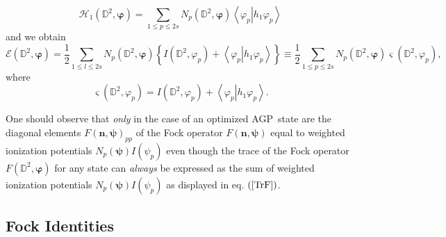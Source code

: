 \documentclass[aps,preprint]{revtex4}%
\begin{document}
\begin{equation}
\mathcal{H}_{1}\left(  \mathbb{D}^{2},\mathbf{\varphi}\right)  =%
{\textstyle\sum\limits_{1\leq p\leq2s}}
N_{p}\left(  \mathbb{D}^{2},\mathbf{\varphi}\right)  \left\langle \left.
\varphi_{p}\right\vert h_{1}\varphi_{p}\right\rangle
\end{equation}
and we obtain
\begin{equation}
\mathcal{E}\left(  \mathbb{D}^{2},\mathbf{\varphi}\right)  =\frac{1}{2}%
{\textstyle\sum\limits_{1\leq l\leq2s}}
N_{p}\left(  \mathbb{D}^{2},\mathbf{\varphi}\right)  \left\{  I\left(
\mathbb{D}^{2},\varphi_{p}\right)  +\left\langle \left.  \varphi
_{p}\right\vert h_{1}\varphi_{p}\right\rangle \right\}  \equiv\frac{1}{2}%
{\textstyle\sum\limits_{1\leq p\leq2s}}
N_{p}\left(  \mathbb{D}^{2},\mathbf{\varphi}\right)  \varsigma\left(
\mathbb{D}^{2},\varphi_{p}\right)  ,
\end{equation}
where
\begin{equation}
\varsigma\left(  \mathbb{D}^{2},\varphi_{p}\right)  =I\left(  \mathbb{D}%
^{2},\varphi_{p}\right)  +\left\langle \left.  \varphi_{p}\right\vert
h_{1}\varphi_{p}\right\rangle .
\end{equation}


One should observe that \emph{only} in the case of an optimized AGP\ state are
the diagonal elements $F\left(  \mathbf{n},\mathbf{\psi}\right)  _{pp}$ of the
Fock operator $F\left(  \mathbf{n},\mathbf{\psi}\right)  $ equal to weighted
ionization potentials $N_{p}\left(  \mathbf{\psi}\right)  I\left(  \psi
_{p}\right)  $ even though the trace of the Fock operator $F\left(
\mathbb{D}^{2},\mathbf{\varphi}\right)  $ for any state can \emph{always }be
expressed as the sum of weighted ionization potentials $N_{p}\left(
\mathbf{\psi}\right)  I\left(  \psi_{p}\right)  $ as displayed in eq. $\left(
\ref{TrF}\right)  $.

\subsection{Fock Identities\label{FockID}}
\end{document}
